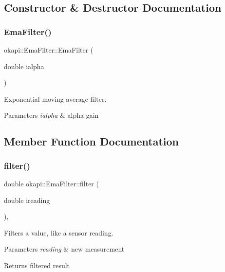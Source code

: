 \subsection{Constructor \& Destructor Documentation}
\mbox{\label{classokapi_1_1EmaFilter_a3e8e6387c71778a44fcdaee79b2f8f66}} 
\subsubsection{\texorpdfstring{EmaFilter()}{EmaFilter()}}
{\footnotesize\ttfamily okapi\+::\+Ema\+Filter\+::\+Ema\+Filter (\begin{DoxyParamCaption}\item[{double}]{ialpha }\end{DoxyParamCaption})\hspace{0.3cm}{\ttfamily [explicit]}}

Exponential moving average filter.


\begin{DoxyParams}{Parameters}
{\em ialpha} & alpha gain \\
\hline
\end{DoxyParams}


\subsection{Member Function Documentation}
\mbox{\label{classokapi_1_1EmaFilter_aeb460ae6655441806591e076342245de}} 
\subsubsection{\texorpdfstring{filter()}{filter()}}
{\footnotesize\ttfamily double okapi\+::\+Ema\+Filter\+::filter (\begin{DoxyParamCaption}\item[{double}]{ireading }\end{DoxyParamCaption})\hspace{0.3cm}{\ttfamily [override]}, {\ttfamily [virtual]}}

Filters a value, like a sensor reading.


\begin{DoxyParams}{Parameters}
{\em reading} & new measurement \\
\hline
\end{DoxyParams}
\begin{DoxyReturn}{Returns}
filtered result 
\end{DoxyReturn}


